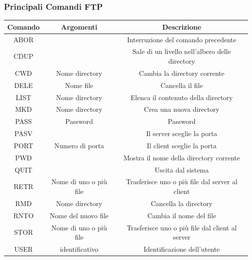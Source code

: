 \documentclass[12pt, letterpaper]{article}
\begin{document}
\subsubsection{Principali Comandi FTP}\begin{center}
    \begin{tabular}{|c|c|c|}
        \hline
        \rowcolor[HTML]{C0C0C0}
        Comando & Argomenti              & Descrizione                                     \\ \hline
        ABOR    &                        & Interruzione del comando precedente             \\ \hline
        CDUP    &                        & Sale di un livello nell'albero delle directory  \\ \hline
        CWD     & Nome directory         & Cambia la directory corrente                    \\ \hline
        DELE    & Nome file              & Cancella il file                                \\ \hline
        LIST    & Nome directory         & Elenca il contenuto della directory             \\ \hline
        MKD     & Nome directory         & Crea una nuova directory                        \\ \hline
        PASS    & Password               & Password                                        \\ \hline
        PASV    &                        & Il server sceglie la porta                      \\ \hline
        PORT    & Numero di porta        & Il client sceglie la porta                      \\ \hline
        PWD     &                        & Mostra il nome della directory corrente         \\ \hline
        QUIT    &                        & Uscita dal sistema                              \\ \hline
        RETR    & Nome di uno o più file & Trasferisce uno o più file dal server al client \\ \hline
        RMD     & Nome directory         & Cancella la directory                           \\ \hline
        RNTO    & Nome del nuovo file    & Cambia il nome del file                         \\ \hline
        STOR    & Nome di uno o più file & Trasferisce uno o più file dal client al server \\ \hline
        USER    & identificativo         & Identificazione dell'utente                     \\ \hline
    \end{tabular}
\end{center}
\end{document}
